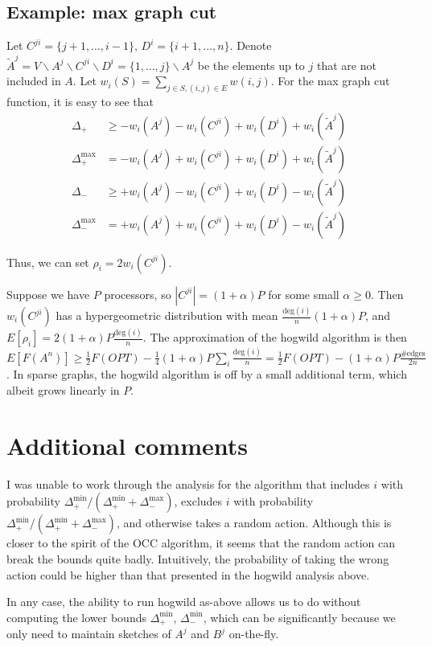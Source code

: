 \documentclass{article} %
\begin{document}
\subsection{Example: max graph cut}
Let $C^{ji} = \{j+1,\dots,i-1\}$, $D^i = \{i+1,\dots,n\}$.
Denote $\tilde{A}^j = V\backslash A^j\backslash C^{ji}\backslash D^i = \{1,\dots,j\}\backslash A^j$ be the elements up to $j$ that are not included in $A$.
Let $w_i(S) = \sum_{j\in S, (i,j)\in E} w(i,j)$.
For the max graph cut function, it is easy to see that 
\begin{align*}
\Delta_+        &\geq - w_i(A^j) -w_i(C^{ji}) + w_i(D^i) + w_i(\tilde{A}^j)\\
\Delta_+^{\max} &=    - w_i(A^j) + w_i(C^{ji}) + w_i(D^i) + w_i(\tilde{A}^j)\\
\Delta_-        &\geq + w_i(A^j) - w_i(C^{ji}) + w_i(D^i) - w_i(\tilde{A}^j)\\
\Delta_-^{\max} &= + w_i(A^j) + w_i(C^{ji}) + w_i(D^i) - w_i(\tilde{A}^j)
\end{align*}

Thus, we can set $\rho_i = 2w_i(C^{ji})$.

Suppose we have $P$ processors, so $|C^{ji}| = (1+\alpha) P$ for some small $\alpha \geq 0$.
Then $w_i(C^{ji})$ has a hypergeometric distribution with mean $\frac{\text{deg}(i)}{n}(1+\alpha)P$, and $E[\rho_i] = 2(1+\alpha)P\frac{\text{deg}(i)}{n}$.
The approximation of the hogwild algorithm is then $E[F(A^n)] \geq \frac{1}{2} F(OPT) - \frac{1}{4}(1+\alpha)P\sum_i\frac{\text{deg}(i)}{n} = \frac{1}{2} F(OPT) - (1+\alpha)P\frac{\#\text{edges}}{2n}$.
In sparse graphs, the hogwild algorithm is off by a small additional term, which albeit grows linearly in $P$.

\section{Additional comments}

I was unable to work through the analysis for the algorithm that includes $i$ with probability $\Delta_+^{\min}/(\Delta_+^{\min} + \Delta_-^{\max})$, excludes $i$ with probability $\Delta_+^{\min}/(\Delta_+^{\min} + \Delta_-^{\max})$, and otherwise takes a random action.
Although this is closer to the spirit of the OCC algorithm, it seems that the random action can break the bounds quite badly.
Intuitively, the probability of taking the wrong action could be higher than that presented in the hogwild analysis above.

In any case, the ability to run hogwild as-above allows us to do without computing the lower bounds $\Delta_+^{\min}$, $\Delta_-^{\min}$, which can be significantly because we only need to maintain sketches of $A^j$ and $B^j$ on-the-fly.
\end{document}
